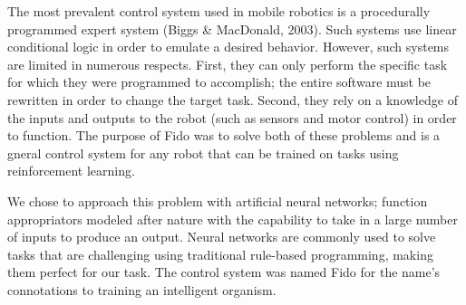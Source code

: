The most prevalent control system used in mobile robotics is a procedurally programmed expert system (Biggs \& MacDonald, 2003).
Such systems use linear conditional logic in order to emulate a desired behavior.
However, such systems are limited in numerous respects.
First, they can only perform the specific task for which they were programmed to accomplish; the entire software must be rewritten in order to change the target task.
Second, they rely on a knowledge of the inputs and outputs to the robot (such as sensors and motor control) in order to function.
The purpose of Fido was to solve both of these problems and is a gneral control system for any robot that can be trained on tasks using reinforcement learning.

We chose to approach this problem with artificial neural networks; function appropriators modeled after nature with the capability to take in a large number of inputs to produce an output.
Neural networks are commonly used to solve tasks that are challenging using traditional rule-based programming, making them perfect for our task.
The control system was named Fido for the name's connotations to training an intelligent organism.
